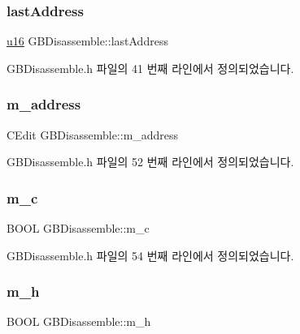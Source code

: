 \subsubsection{\texorpdfstring{last\+Address}{lastAddress}}
{\footnotesize\ttfamily \mbox{\hyperlink{_system_8h_a9e6c91d77e24643b888dbd1a1a590054}{u16}} G\+B\+Disassemble\+::last\+Address}



G\+B\+Disassemble.\+h 파일의 41 번째 라인에서 정의되었습니다.

\mbox{\label{class_g_b_disassemble_ae307e3f799572b623e21bb94c345c5ce}} 
\subsubsection{\texorpdfstring{m\+\_\+address}{m\_address}}
{\footnotesize\ttfamily C\+Edit G\+B\+Disassemble\+::m\+\_\+address}



G\+B\+Disassemble.\+h 파일의 52 번째 라인에서 정의되었습니다.

\mbox{\label{class_g_b_disassemble_aa5e67e4603c41c05ed19f599336139be}} 
\subsubsection{\texorpdfstring{m\+\_\+c}{m\_c}}
{\footnotesize\ttfamily B\+O\+OL G\+B\+Disassemble\+::m\+\_\+c}



G\+B\+Disassemble.\+h 파일의 54 번째 라인에서 정의되었습니다.

\mbox{\label{class_g_b_disassemble_a2756a29fdbf8424bd977ea326b00b9e7}} 
\subsubsection{\texorpdfstring{m\+\_\+h}{m\_h}}
{\footnotesize\ttfamily B\+O\+OL G\+B\+Disassemble\+::m\+\_\+h}



